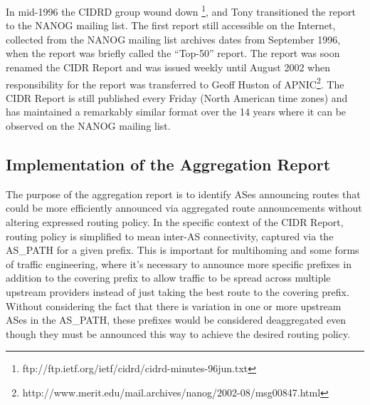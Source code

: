 In mid-1996 the CIDRD group wound down
\footnote{ftp://ftp.ietf.org/ietf/cidrd/cidrd-minutes-96jun.txt}, and Tony
transitioned the report to the NANOG mailing list. The first report still
accessible on the Internet, collected from the NANOG mailing list archives
\cite{NANOG} dates from September 1996, when the report was briefly called the
``Top-50'' report. The report was soon renamed the CIDR Report and was issued
weekly until August 2002 when responsibility for the report was transferred to
Geoff Huston of
APNIC\footnote{http://www.merit.edu/mail.archives/nanog/2002-08/msg00847.html}.
The CIDR Report is still published every Friday (North American time zones) and
has maintained a remarkably similar format over the 14 years where it can be
observed on the NANOG mailing list.

\subsection{Implementation of the Aggregation Report}

The purpose of the aggregation report is to identify ASes announcing routes
that could be more efficiently announced via aggregated route announcements
without altering expressed routing policy. In the specific context of the CIDR
Report, routing policy is simplified to mean inter-AS connectivity, captured
via the AS\_PATH for a given prefix. This is important for multihoming and some
forms of traffic engineering, where it's necessary to announce more specific
prefixes in addition to the covering prefix to allow traffic to be spread
across multiple upstream providers instead of just taking the best route to the
covering prefix. Without considering the fact that there is variation in one or
more upstream ASes in the AS\_PATH, these prefixes would be considered
deaggregated even though they must be announced this way to achieve the desired
routing policy.

